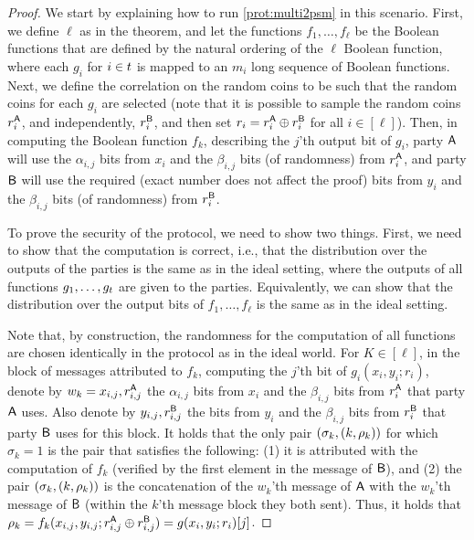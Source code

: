 \begin{proof}
We start by explaining how to run \cref{prot:multi2psm} in this scenario. First, we define $\ell$ as in the theorem, and let the functions $f_1,\ldots,f_\ell$ be the Boolean functions that are defined by the natural ordering of the $\ell$ Boolean function, where each $g_i$ for  $i\in t$ is mapped to an $m_i$ long sequence of Boolean functions. Next, we define the correlation on the random coins to be such that the random coins for each $g_i$ are selected (note that it is possible to sample the random coins 
$r_i^{\mathsf{A}}$, and independently, $r_i^{\mathsf{B}}$, and then set $r_i = r_i^{\mathsf{A}}\oplus r_i^{\mathsf{B}}$ for all $i\in[\ell]$). Then, in computing the Boolean function $f_k$, describing the  $j$'th output bit of $g_i$, party $\mathsf{A}$ will use the $\alpha_{i,j}$ bits from $x_i$  and the $\beta_{i,j}$  bits (of randomness) from $r_i^{\mathsf{A}}$, and party $\mathsf{B}$ will use the required (exact number does not affect the proof) bits from $y_i$  and the $\beta_{i,j}$ bits (of randomness) from $r_i^{\mathsf{B}}$.

To prove the security of the protocol, we need to show two things. First, we need to show that the computation is correct, i.e., that the distribution over the outputs of the parties is the same as in the ideal setting, where the outputs of all functions $g_1,\ldots, g_{t}$ are given to the parties. Equivalently, we can show that the distribution over the output bits of $f_1,\ldots,f_{\ell}$ is the same as in the ideal setting. 


Note that, by construction, the randomness for the computation of all functions are chosen identically in the protocol as in the ideal world. For $K\in[\ell]$, in the block of messages attributed to $f_k$, computing the $j$'th bit of $g_i(x_i,y_i;r_i)$, denote by $w_k = x_{i,j},r_{i,j}^{\mathsf{A}}$ the $\alpha_{i,j}$ bits from $x_i$  and the $\beta_{i,j}$ bits from $r_i^{\mathsf{A}}$ that party $\mathsf{A}$ uses.  Also denote by $y_{i,j},r_{i,j}^{\mathsf{B}}$ the  bits from $y_i$  and the $\beta_{i,j}$ bits from $r_i^{\mathsf{B}}$ that party $\mathsf{B}$ uses for this block.
It holds that
the only pair $\left( \sigma_k,\left(k,\rho_k\right)\right)$ for which $\sigma_k = 1$ is the pair that satisfies the following: (1) it is attributed with the computation of $f_k$ (verified by the first element in the message of $\mathsf{B}$), and (2)  the pair $\left( \sigma_k,\left(k,\rho_k\right)\right)$ is the concatenation of the $w_k$'th message
of $\mathsf{A}$ with the $w_k$'th message
of $\mathsf{B}$ (within the $k$'th message block they both sent). Thus, it holds that $\rho_k = f_k(x_{i,j},y_{i,j};r_{i,j}^{\mathsf{A}}\oplus r_{i,j}^{\mathsf{B}}) = g(x_i,y_i;r_i)[j]$.


\end{proof}
